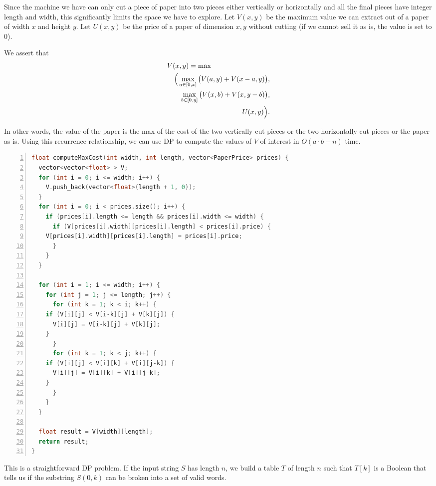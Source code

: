 Since the machine we have can only cut a piece of paper into two
pieces either vertically or horizontally and all the final pieces have integer
length and width, this significantly limits the space we
have to explore. Let $V(x,y)$ be the maximum value we
can extract out of a paper of width $x$ and height $y$.
Let $U(x,y)$ be the price of a paper of dimension $x,y$ without
cutting (if we cannot sell it as is, the value is set to 0).

We assert that
\begin{eqnarray*}
\lefteqn{V(x,y)  =  \max} \\
 & & \Big(\max_{a \in [0,x]} \big(V(a,y) + V(x-a, y)\big),  \\
 & & \max_{b \in [0,y]} \big(V(x,b) + V(x, y-b)\big),  \\ 
 & & U(x,y)\Big).
\end{eqnarray*}

In other words, the value of the paper is the max of the cost of the two
vertically cut pieces or the two horizontally cut pieces or the paper
as is. Using this recurrence relationship, we can use DP to compute the values of $V$ of interest in $O(a\cdot b + n)$
time.
\begin{lstlisting}[basicstyle=\footnotesize,numbers=left,breaklines=true,language=C++]
float computeMaxCost(int width, int length, vector<PaperPrice> prices) {
  vector<vector<float> > V;
  for (int i = 0; i <= width; i++) {
    V.push_back(vector<float>(length + 1, 0));
  }
  for (int i = 0; i < prices.size(); i++) {
    if (prices[i].length <= length && prices[i].width <= width) {
      if (V[prices[i].width][prices[i].length] < prices[i].price) {
	V[prices[i].width][prices[i].length] = prices[i].price;
      }
    }
  }

  for (int i = 1; i <= width; i++) {
    for (int j = 1; j <= length; j++) {
      for (int k = 1; k < i; k++) {
	if (V[i][j] < V[i-k][j] + V[k][j]) {
	  V[i][j] = V[i-k][j] + V[k][j];
	}
      }
      for (int k = 1; k < j; k++) {
	if (V[i][j] < V[i][k] + V[i][j-k]) {
	  V[i][j] = V[i][k] + V[i][j-k];
	}
      }
    }
  }

  float result = V[width][length];
  return result;
}
\end{lstlisting}

This is a straightforward DP problem. If the input
string $S$ has length $n$, we build a table $T$ of length $n$ such that $T[k]$ is a
Boolean that tells
us if the substring $S(0,k)$ can be broken into a set of valid words.

